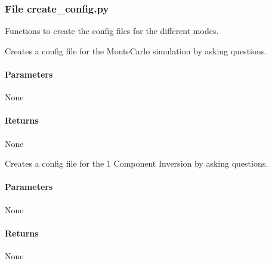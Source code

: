 \documentclass[letterpaper,10pt,english]{sphinxmanual}
\begin{document}
\subsubsection{File create\_config.py}
\label{\detokenize{functions:file-create-config-py}}
\sphinxAtStartPar
Functions to create the config files for the different modes.

\begin{fulllineitems}
\label{\detokenize{functions:create_config.config_MC}}
\pysigstartsignatures
{}
\pysigstopsignatures
\sphinxAtStartPar
Creates a config file for the Monte\sphinxhyphen{}Carlo simulation by asking questions.


\paragraph{Parameters}
\label{\detokenize{functions:id30}}
\sphinxAtStartPar
None


\paragraph{Returns}
\label{\detokenize{functions:id31}}
\sphinxAtStartPar
None

\end{fulllineitems}


\begin{fulllineitems}
\label{\detokenize{functions:create_config.config_1C}}
\pysigstartsignatures
{}
\pysigstopsignatures
\sphinxAtStartPar
Creates a config file for the 1 Component Inversion by asking questions.


\paragraph{Parameters}
\label{\detokenize{functions:id32}}
\sphinxAtStartPar
None


\paragraph{Returns}
\label{\detokenize{functions:id33}}
\sphinxAtStartPar
None

\end{fulllineitems}
\end{document}
